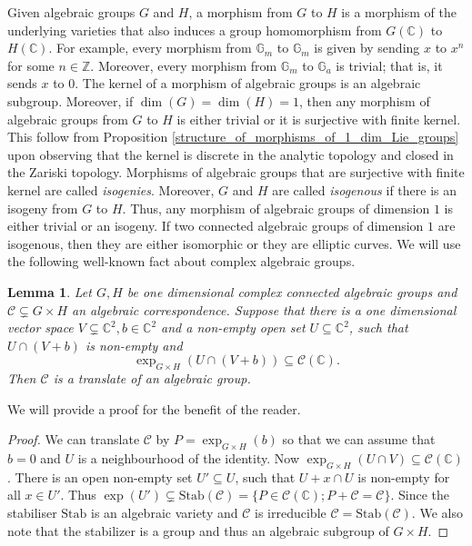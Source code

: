 \documentclass[12pt, reqno]{amsart}
\newcommand{\G}{\mathbb{G}}
\newcommand{\C}{\mathbb{C}}
\newcommand{\Z}{\mathbb{Z}}
\newtheorem{lem}[theorem]{Lemma}
\theoremstyle{remark}
\theoremstyle{definition}
\numberwithin{equation}{section}
\begin{document}
Given algebraic groups $G$ and $H$, a morphism from $G$ to $H$ is a morphism of the underlying varieties that also induces a group homomorphism from $G(\C)$ to $H(\C)$. For example, every morphism from $\G_m$ to $\G_m$ is given by sending $x$ to $x^n$ for some $n \in \Z$. Moreover, every morphism from $\G_m$ to $\G_a$ is trivial; that is, it sends $x$ to $0$. The kernel of a morphism of algebraic groups is an algebraic subgroup. Moreover, if $\dim(G) = \dim(H) = 1$, then any morphism of algebraic groups from $G$ to $H$ is either trivial or it is surjective with finite kernel. This follow from Proposition \ref{structure_of_morphisms_of_1_dim_Lie_groups} upon observing that the kernel is discrete in the analytic topology and closed in the Zariski topology. Morphisms of algebraic groups that are surjective with finite kernel are called \emph{isogenies}. Moreover, $G$ and $H$ are called \emph{isogenous} if there is an isogeny from $G$ to $H$. Thus, any morphism of algebraic groups of dimension $1$ is either trivial or an isogeny. If two connected algebraic groups of dimension $1$ are isogenous, then they are either isomorphic or they are elliptic curves. 
We will use the following well-known fact about complex algebraic groups. 
\begin{lem}\label{lemtangent} Let $G, H$ be one dimensional complex connected algebraic groups and $\mathcal{C} \subsetneq G \times H$ an algebraic correspondence. Suppose that there is a one dimensional vector space $V \subsetneq \mathbb{C}^2, b \in \mathbb{C}^2$ and  a non-empty open set $U \subseteq \mathbb{C}^2$, such that $U \cap (V + b) $ is non-empty and
    $$\exp_{G \times H}(U \cap (V + b)) \subseteq \mathcal{C}(\mathbb{C}).$$
    Then $\mathcal{C}$ is a translate of an algebraic group. 
\end{lem}
We will provide a proof for the benefit of the reader. 
\begin{proof} We can translate $\mathcal{C}$ by $P = \exp_{G \times H}(b)$ so that we can assume that $b = 0$ and $U$ is a neighbourhood of the identity. Now $\exp_{G \times H}(U \cap V) \subseteq \mathcal{C}(\mathbb{C})$. There is an open non-empty set $U' \subseteq U $, such that $U + x\cap U $ is non-empty for all $x \in U'$. Thus $\exp(U') \subsetneq \text{Stab}(\mathcal{C}) = \{P \in \mathcal{C}(\mathbb{C}); P + \mathcal{C} = \mathcal{C}\}$. Since the stabiliser $\text{Stab}$ is an algebraic variety and $\mathcal{C}$ is irreducible $\mathcal{C} = \text{Stab}(\mathcal{C})$. We also note that the stabilizer is a group and thus an algebraic subgroup of $G \times H$.
\end{proof}
\end{document}
